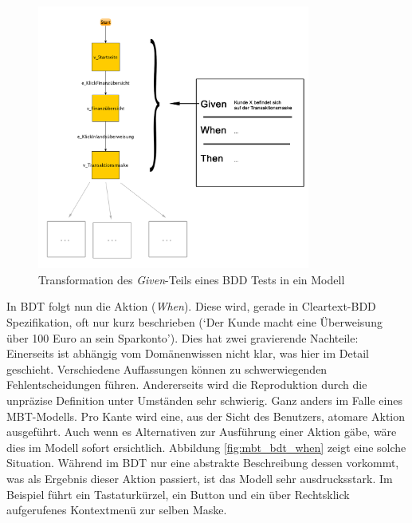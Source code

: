 \begin{figure} 
  \centering
     \includegraphics[width=0.8\textwidth]{figures/mbt_bdt_given.png}
  \caption{Transformation des \textit{Given}-Teils eines BDD Tests in ein Modell}
  \label{fig:mbt_bdt_given}
\end{figure}

In \Gls{BDT} folgt nun die Aktion (\textit{When}). Diese wird, gerade in Cleartext-\Gls{BDD} Spezifikation, oft nur kurz beschrieben (`Der Kunde macht eine Überweisung über 100 Euro an sein Sparkonto'). Dies hat zwei gravierende Nachteile: Einerseits ist abhängig vom Domänenwissen nicht klar, was hier im Detail geschieht. Verschiedene Auffassungen können zu schwerwiegenden Fehlentscheidungen führen. Andererseits wird die Reproduktion durch die unpräzise Definition unter Umständen sehr schwierig. Ganz anders im Falle eines \Gls{MBT}-Modells. Pro Kante wird eine, aus der Sicht des Benutzers, atomare Aktion ausgeführt. Auch wenn es Alternativen zur Ausführung einer Aktion gäbe, wäre dies im Modell sofort ersichtlich. Abbildung \ref{fig:mbt_bdt_when} zeigt eine solche Situation. Während im \Gls{BDT} nur eine abstrakte Beschreibung dessen vorkommt, was als Ergebnis dieser Aktion passiert, ist das Modell sehr ausdrucksstark. Im Beispiel führt ein Tastaturkürzel, ein Button und ein über Rechtsklick aufgerufenes Kontextmenü zur selben Maske.

